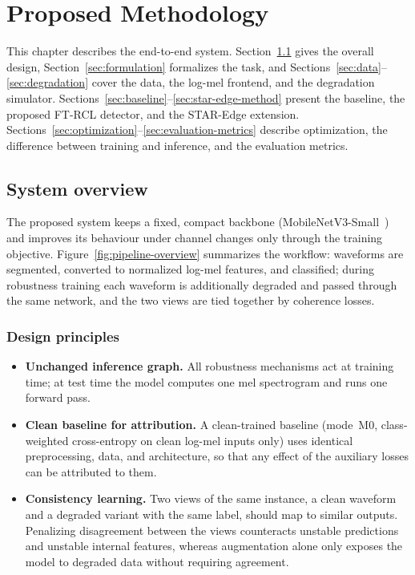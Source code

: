 \chapter{Proposed Methodology}
\label{ch:methodology}

This chapter describes the end-to-end system. Section~\ref{sec:overview} gives the overall design, Section~\ref{sec:formulation} formalizes the task, and Sections~\ref{sec:data}--\ref{sec:degradation} cover the data, the log-mel frontend, and the degradation simulator. Sections~\ref{sec:baseline}--\ref{sec:star-edge-method} present the baseline, the proposed FT-RCL detector, and the STAR-Edge extension. Sections~\ref{sec:optimization}--\ref{sec:evaluation-metrics} describe optimization, the difference between training and inference, and the evaluation metrics.

\section{System overview}
\label{sec:overview}

The proposed system keeps a fixed, compact backbone (MobileNetV3-Small~\cite{howard2019mobilenetv3}) and improves its behaviour under channel changes only through the training objective. Figure~\ref{fig:pipeline-overview} summarizes the workflow: waveforms are segmented, converted to normalized log-mel features, and classified; during robustness training each waveform is additionally degraded and passed through the same network, and the two views are tied together by coherence losses.

\subsection{Design principles}

\begin{itemize}
  \item \textbf{Unchanged inference graph.} All robustness mechanisms act at training time; at test time the model computes one mel spectrogram and runs one forward pass.
  \item \textbf{Clean baseline for attribution.} A clean-trained baseline (mode~M0, class-weighted cross-entropy on clean log-mel inputs only) uses identical preprocessing, data, and architecture, so that any effect of the auxiliary losses can be attributed to them.
  \item \textbf{Consistency learning.} Two views of the same instance, a clean waveform and a degraded variant with the same label, should map to similar outputs. Penalizing disagreement between the views counteracts unstable predictions and unstable internal features, whereas augmentation alone only exposes the model to degraded data without requiring agreement.
\end{itemize}

